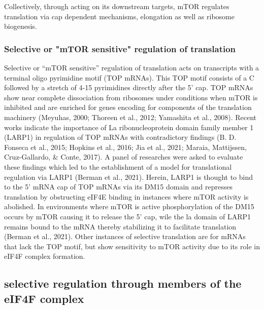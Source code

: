 \documentclass[12pt,openany]{book}
\begin{document}
Collectively, through acting on its downstream targets, mTOR regulates
translation via cap dependent mechanisms, elongation as well as ribosome
biogenesis.

\subsubsection{Selective or "mTOR sensitive" regulation of translation}

Selective or ``mTOR sensitive'' regulation of translation acts on
transcripts with a terminal oligo pyrimidine motif (TOP mRNAs). This TOP
motif consists of a C followed by a stretch of 4-15 pyrimidines directly
after the 5' cap. TOP mRNAs show near complete dissociation from
ribosomes under conditions when mTOR is inhibited and are enriched for
genes encoding for components of the translation machinery (Meyuhas,
2000; Thoreen et al., 2012; Yamashita et al., 2008). Recent works
indicate the importance of La ribonucleoprotein domain family member 1
(LARP1) in regulation of TOP mRNAs with contradictory findings (B. D.
Fonseca et al., 2015; Hopkins et al., 2016; Jia et al., 2021; Maraia,
Mattijssen, Cruz-Gallardo, \& Conte, 2017). A panel of researches were
asked to evaluate these findings which led to the establishment of a
model for translational regulation via LARP1 (Berman et al., 2021).
Herein, LARP1 is thought to bind to the 5' mRNA cap of TOP mRNAs via its
DM15 domain and represses translation by obstructing eIF4E binding in
instances where mTOR activity is abolished. In environments where mTOR
is active phosphorylation of the DM15 occurs by mTOR causing it to
release the 5' cap, wile the la domain of LARP1 remains bound to the
mRNA thereby stabilizing it to facilitate translation (Berman et al.,
2021). Other instances of selective translation are for mRNAs that lack
the TOP motif, but show sensitivity to mTOR activity due to its role in
eIF4F complex formation.

\subsection{selective regulation through members of the eIF4F complex}
\end{document}
